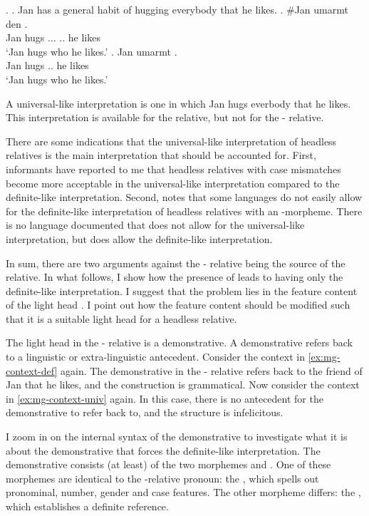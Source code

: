 \ex.
\a. Jan has a general habit of hugging everybody that he likes.\label{ex:mg-context-univ}
\bg. \#Jan umarmt den   .\\
Jan hugs ... .. he likes\\
`Jan hugs who he likes.'
\bg. Jan umarmt   .\\
Jan hugs .. he likes\\
`Jan hugs who he likes.'

A universal-like interpretation is one in which Jan hugs everbody that he likes.
This interpretation is available for the  relative, but not for the - relative.

There are some indications that the universal-like interpretation of headless relatives is the main interpretation that should be accounted for.
First, informants have reported to me that headless relatives with case mismatches become more acceptable in the universal-like interpretation compared to the definite-like interpretation.
Second,  notes that some languages do not easily allow for the definite-like interpretation of headless relatives with an -morpheme. There is no language documented that does not allow for the universal-like interpretation, but does allow the definite-like interpretation.

In sum, there are two arguments against the - relative being the source of the  relative. In what follows, I show how the presence of  leads to having only the definite-like interpretation. I suggest that the problem lies in the feature content of the light head . I point out how the feature content should be modified such that it is a suitable light head for a headless relative.

The light head in the - relative is a demonstrative. A demonstrative refers back to a linguistic or extra-linguistic antecedent. Consider the context in \ref{ex:mg-context-def} again. The demonstrative  in the - relative refers back to the friend of Jan that he likes, and the construction is grammatical. Now consider the context in \ref{ex:mg-context-univ} again. In this case, there is no antecedent for the demonstrative  to refer back to, and the structure is infelicitous.

I zoom in on the internal syntax of the demonstrative  to investigate what it is about the demonstrative that forces the definite-like interpretation. The demonstrative consists (at least) of the two morphemes  and . One of these morphemes are identical to the -relative pronoun: the , which spells out pronominal, number, gender and case features. The other morpheme differs: the , which establishes a definite reference.

